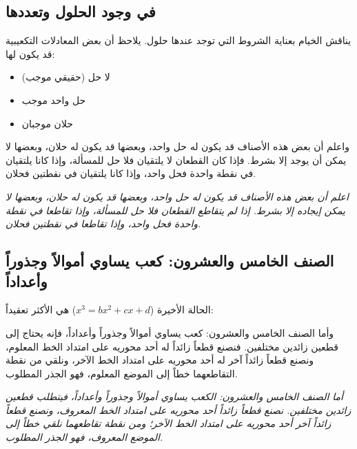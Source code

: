 \documentclass[11pt,a4paper]{book}
\newcommand{\ar}[1]{\leavevmode\arabicfont\beginR #1\endR}
\newenvironment{propbox}[1][]
  {\def\propboxtitle{#1}%
   \begin{snugshade}%
   \ifx\propboxtitle\empty\else
     \noindent{\bfseries\arabicfontbold\beginR #1\endR}\par\vspace{2pt}
   \fi}
  {\end{snugshade}}
\begin{document}
\subsection{\ar{في وجود الحلول وتعددها}}

\ar{يناقش الخيام بعناية الشروط التي توجد عندها حلول. يلاحظ أن بعض المعادلات التكعيبية قد يكون لها:}

\begin{itemize}[noitemsep]
\item \ar{لا حل (حقيقي موجب)}
\item \ar{حل واحد موجب}
\item \ar{حلان موجبان}
\end{itemize}

\begin{propbox}[]
\ar{واعلم أن بعض هذه الأصناف قد يكون له حل واحد، وبعضها قد يكون له حلان، وبعضها لا يمكن أن يوجد إلا بشرط. فإذا كان القطعان لا يلتقيان فلا حل للمسألة، وإذا كانا يلتقيان في نقطة واحدة فحل واحد، وإذا كانا يلتقيان في نقطتين فحلان.}

\vspace{0.3cm}

\textit{اعلم أن بعض هذه الأصناف قد يكون له حل واحد، وبعضها قد يكون له حلان، وبعضها لا يمكن إيجاده إلا بشرط. إذا لم يتقاطع القطعان فلا حل للمسألة، وإذا تقاطعا في نقطة واحدة فحل واحد، وإذا تقاطعا في نقطتين فحلان.}
\end{propbox}

\subsection{\ar{الصنف الخامس والعشرون: كعب يساوي أموالاً وجذوراً وأعداداً}}

\ar{الحالة الأخيرة ($x^3 = bx^2 + cx + d$) هي الأكثر تعقيداً:}

\begin{propbox}[]
\ar{وأما الصنف الخامس والعشرون: كعب يساوي أموالاً وجذوراً وأعداداً، فإنه يحتاج إلى قطعين زائدين مختلفين. فنصنع قطعاً زائداً له أحد محوريه على امتداد الخط المعلوم، ونصنع قطعاً زائداً آخر له أحد محوريه على امتداد الخط الآخر، ونلقي من نقطة التقاطعهما خطاً إلى الموضع المعلوم، فهو الجذر المطلوب.}

\vspace{0.3cm}

\textit{أما الصنف الخامس والعشرون: الكعب يساوي أموالاً وجذوراً وأعداداً، فيتطلب قطعين زائدين مختلفين. نصنع قطعاً زائداً أحد محوريه على امتداد الخط المعروف، ونصنع قطعاً زائداً آخر أحد محوريه على امتداد الخط الآخر؛ ومن نقطة تقاطعهما نلقي خطاً إلى الموضع المعروف، فهو الجذر المطلوب.}
\end{propbox}
\end{document}
